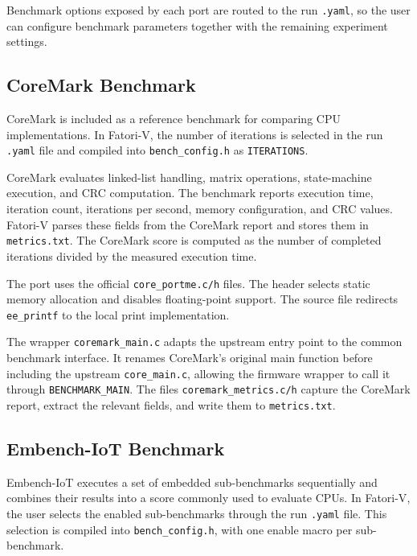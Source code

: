 Benchmark options exposed by each port are routed to the run \texttt{.yaml}, so the user can configure benchmark parameters together with the remaining experiment settings.




\subsection{CoreMark Benchmark}
\label{chap7:coremark}

CoreMark is included as a reference benchmark for comparing \ac{CPU} implementations. In \ac{Fatori-V}, the number of iterations is selected in the run \texttt{.yaml} file and compiled into \texttt{bench\_config.h} as \texttt{ITERATIONS}.

CoreMark evaluates linked-list handling, matrix operations, state-machine execution, and \ac{CRC} computation. The benchmark reports execution time, iteration count, iterations per second, memory configuration, and \ac{CRC} values. \ac{Fatori-V} parses these fields from the CoreMark report and stores them in \texttt{metrics.txt}. The CoreMark score is computed as the number of completed iterations divided by the measured execution time.

The port uses the official \texttt{core\_portme.c/h} files. The header selects static memory allocation and disables floating-point support. The source file redirects \texttt{ee\_printf} to the local print implementation.

The wrapper \texttt{coremark\_main.c} adapts the upstream entry point to the common benchmark interface. It renames CoreMark's original main function before including the upstream \texttt{core\_main.c}, allowing the firmware wrapper to call it through \texttt{BENCHMARK\_MAIN}. The files \texttt{coremark\_metrics.c/h} capture the CoreMark report, extract the relevant fields, and write them to \texttt{metrics.txt}.






\subsection{Embench-IoT Benchmark}
\label{chap7:embench-iot}

Embench-IoT executes a set of embedded sub-benchmarks sequentially and combines their results into a score commonly used to evaluate \acp{CPU}. In \ac{Fatori-V}, the user selects the enabled sub-benchmarks through the run \texttt{.yaml} file. This selection is compiled into \texttt{bench\_config.h}, with one enable macro per sub-benchmark.

